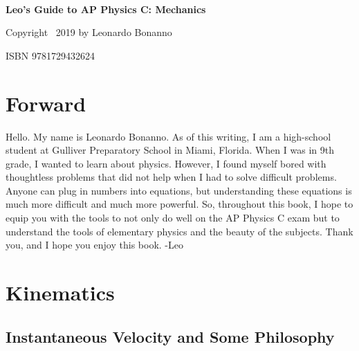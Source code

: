 \documentclass{article}[gray]
\numberwithin{equation}{subsection}
\begin{document}
\begin{center}
\
\newline
\newline
\newline
\newline
\newline
\newline
\newline
\newline
\newline
\newline
\newline

\textbf{\LARGE Leo's Guide to AP Physics C: Mechanics}
\end{center}
\begin{center}
Copyright \textcopyright \ 2019 by Leonardo Bonanno
\end{center}
\begin{center}
\footnotesize ISBN 9781729432624


\end{center}
\newpage
\tableofcontents
\newpage

\section{Forward}
Hello. My name is Leonardo Bonanno. As of this writing, I am a high-school student at Gulliver Preparatory School in Miami, Florida. When I was in 9th grade, I wanted to learn about physics. However, I found myself bored with thoughtless problems that did not help when I had to solve difficult problems. Anyone can plug in numbers into equations, but understanding these equations is much more difficult and much more powerful. So, throughout this book, I hope to equip you with the tools to not only do well on the AP Physics C exam but to understand the tools of elementary physics and the beauty of the subjects. Thank you, and I hope you enjoy this book.
\newline
-Leo

\pagebreak

\section{Kinematics}

\subsection{Instantaneous Velocity and Some Philosophy}
\end{document}
